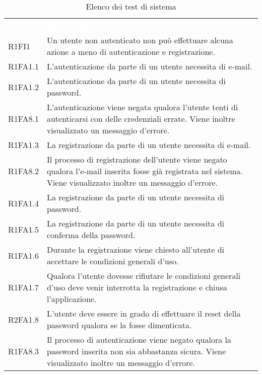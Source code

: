 {
\renewcommand{\arraystretch}{1.5}
\centering
\begin{longtable}{ >{\centering}p{} >{}p{}}
\caption{Elenco dei test di sistema}\\
\rowcolor{rossoep}
\textcolor{white}{\textbf{Codice}} & \textcolor{white}{\textbf{Descrizione}} \\

R1FI1 & Un utente non autenticato non può effettuare alcuna azione a meno di autenticazione e registrazione.\\

R1FA1.1 & L'autenticazione da parte di un utente necessita di e-mail.\\

R1FA1.2 & L'autenticazione da parte di un utente necessita di password. \\

R1FA8.1 & L'autenticazione viene negata qualora l'utente tenti di autenticarsi con delle credenziali errate. Viene inoltre visualizzato un messaggio d'errore.\\

R1FA1.3 & La registrazione da parte di un utente necessita di e-mail.\\

R1FA8.2 & Il processo di registrazione dell'utente viene negato qualora l'e-mail inserita fosse già registrata nel sistema. Viene visualizzato inoltre un messaggio d'errore.\\

R1FA1.4 & La registrazione da parte di un utente necessita di password.\\

R1FA1.5 & La registrazione da parte di un utente necessita di conferma della password.\\

R1FA1.6 & Durante la registrazione viene chiesto all'utente di accettare le condizioni generali d'uso.\\

R1FA1.7 & Qualora l'utente dovesse rifiutare le condizioni generali d'uso deve venir interrotta la registrazione e chiusa l'applicazione.\\

R2FA1.8 & L'utente deve essere in grado di effettuare il reset della password qualora se la fosse dimenticata.\\

R1FA8.3 & Il processo di autenticazione viene negato qualora la password inserita non sia abbastanza sicura. Viene visualizzato inoltre un messaggio d'errore.\\


\end{longtable}}
